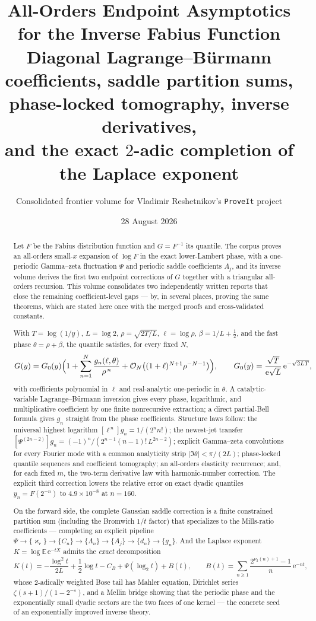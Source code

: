 \documentclass[11pt,oneside]{article}
\title{\bfseries All-Orders Endpoint Asymptotics\\
for the Inverse Fabius Function\\[0.45em]
\large Diagonal Lagrange--B\"urmann coefficients, saddle partition sums,\\
phase-locked tomography, inverse derivatives,\\
and the exact $2$-adic completion of the Laplace exponent}
\author{Consolidated frontier volume for Vladimir Reshetnikov's \texttt{ProveIt} project}
\date{28 August 2026}
\numberwithin{equation}{section}
\theoremstyle{definition}
\theoremstyle{remark}
\newcommand{\E}{\mathbb E}
\newcommand{\e}{\mathrm e}
\newcommand{\bigO}{\mathcal O}
\newcommand{\vtwo}{\nu_2}
\newcommand{\abs}[1]{\left\lvert #1\right\rvert}
\newcommand{\CB}{C_{B}}
\newcommand{\Gzero}{G_0}
\begin{document}
\maketitle

\begin{abstract}
\noindent
Let $F$ be the Fabius distribution function and $G=F^{-1}$ its
quantile.  The corpus proves an all-orders small-$x$ expansion of
$\log F$ in the exact lower-Lambert phase, with a one-periodic
Gamma--zeta fluctuation $\Psi$ and periodic saddle coefficients
$A_j$, and its inverse volume derives the first two endpoint
corrections of $G$ together with a triangular all-orders recursion.
This volume consolidates two independently written reports that close
the remaining coefficient-level gaps --- by, in several places,
proving the same theorems, which are stated here once with the merged
proofs and cross-validated constants.

With $T=\log(1/y)$, $L=\log2$, $\rho=\sqrt{2T/L}$, $\ell=\log\rho$,
$\beta=1/L+\tfrac12$, and the fast phase $\theta=\rho+\beta$, the
quantile satisfies, for every fixed $N$,
\[
 G(y)=\Gzero(y)\Bigl(1+\sum_{n=1}^{N}
 \frac{g_n(\ell,\theta)}{\rho^{\,n}}
 +\bigO_N\bigl((1+\ell)^{N+1}\rho^{-N-1}\bigr)\Bigr),
 \qquad
 \Gzero(y)=\frac{\sqrt T}{\e\sqrt L}\,\e^{-\sqrt{2LT}},
\]
with coefficients polynomial in $\ell$ and real-analytic one-periodic
in $\theta$.  A catalytic-variable Lagrange--B\"urmann inversion
gives every phase, logarithmic, and multiplicative coefficient by one
finite nonrecursive extraction; a direct partial-Bell formula gives
$g_n$ straight from the phase coefficients.  Structure laws follow:
the universal highest logarithm $[\ell^{\,n}]g_n=1/(2^{n}n!)$; the
newest-jet transfer
$[\Psi^{(2n-2)}]g_n=(-1)^{n}/(2^{n-1}(n-1)!\,L^{2n-2})$; explicit
Gamma--zeta convolutions for every Fourier mode with a common
analyticity strip $\abs{\Im\theta}<\pi/(2L)$; phase-locked quantile
sequences and coefficient tomography; an all-orders elasticity
recurrence; and, for each fixed $m$, the two-term derivative law with
harmonic-number correction.  The explicit third correction lowers the
relative error on exact dyadic quantiles $y_n=F(2^{-n})$ to
$4.9\times10^{-8}$ at $n=160$.

On the forward side, the complete Gaussian saddle correction is a
finite constrained partition sum (including the Bromwich
$1/t$ factor) that specializes to the Mills-ratio coefficients ---
completing an explicit pipeline
$\Psi\to\{\varkappa_r\}\to\{C_n\}\to\{\Lambda_n\}\to\{A_j\}\to
\{d_n\}\to\{g_n\}$.  And the Laplace exponent
$K=\log\E\,\e^{-tX}$ admits the \emph{exact} decomposition
\[
 K(t)=-\frac{\log^2t}{2L}+\frac12\log t-\CB
 +\Psi(\log_2t)+B(t),
 \qquad
 B(t)=\sum_{n\ge1}\frac{2^{\vtwo(n)+1}-1}{n}\,\e^{-nt},
\]
whose $2$-adically weighted Bose tail has Mahler equation, Dirichlet
series $\zeta(s+1)/(1-2^{-s})$, and a Mellin bridge showing that the
periodic phase and the exponentially small dyadic sectors are the two
faces of one kernel --- the concrete seed of an exponentially
improved inverse theory.


\end{abstract}
\end{document}
